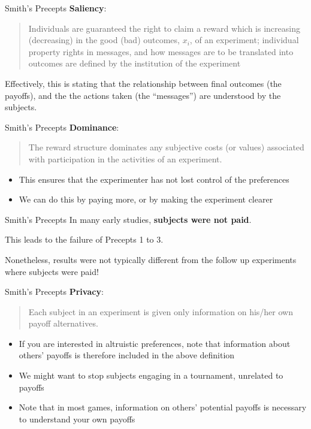 \documentclass{beamer}
\begin{document}
\begin{frame}{Smith's Precepts}
\textbf{Saliency}:
\begin{quotation}
Individuals are guaranteed the right to claim a reward which is increasing (decreasing) in the good (bad) outcomes, $x_i$, of an experiment; individual property rights in messages, and how messages are to be translated into outcomes are defined by the institution of the experiment
\end{quotation}
\pause

Effectively, this is stating that the relationship between final outcomes (the payoffs), and the the actions taken (the ``messages'') are understood by the subjects.
\end{frame}

\begin{frame}{Smith's Precepts}
\textbf{Dominance}:
\begin{quotation}
The reward structure dominates any subjective costs (or values) associated with participation in the activities of an experiment.
\end{quotation}
\pause

	\begin{itemize}
		\item This ensures that the experimenter has not lost control of the preferences
		\item We can do this by paying more, or by making the experiment clearer
	\end{itemize}
\end{frame}

\begin{frame}{Smith's Precepts}
In many early studies, \textbf{subjects were not paid}.

This leads to the failure of Precepts 1 to 3.

Nonetheless, results were not typically different from the follow up experiments where subjects were paid!
\end{frame}

\begin{frame}{Smith's Precepts}
\textbf{Privacy}:
\begin{quotation}
Each subject in an experiment is given only information on his/her own payoff alternatives.
\end{quotation}
\pause

	\begin{itemize}
		\item If you are interested in altruistic preferences, note that information about others' payoffs is therefore included in the above definition
		\item We might want to stop subjects engaging in a tournament, unrelated to payoffs
		\item Note that in most games, information on others' potential payoffs is necessary to understand your own payoffs
	\end{itemize}
\end{frame}
\end{document}
